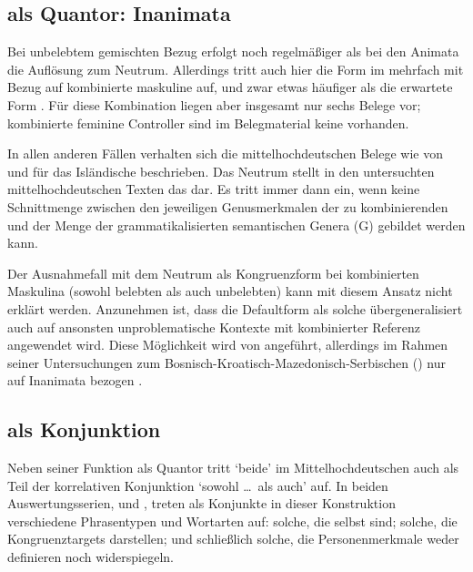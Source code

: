 
\subsection{ als Quantor: Inanimata}

Bei unbelebtem gemischten Bezug erfolgt noch regelmäßiger als bei den
Animata die Auflösung zum Neutrum. Allerdings
tritt auch hier die Form  im \CAO{} mehrfach mit Bezug auf
kombinierte maskuline  auf, und zwar etwas häufiger als die
erwartete Form . Für diese Kombination liegen aber insgesamt nur
sechs Belege vor; kombinierte feminine Controller sind im Belegmaterial keine
vorhanden.

In allen anderen Fällen verhalten sich die
mittelhochdeutschen Belege wie von
\citet{wechslerzlatic2003} und \citet{wechsler2009} für das
Isländische beschrieben. Das Neutrum stellt in den untersuchten
mittelhochdeutschen Texten das  dar. Es
tritt immer dann ein, wenn keine Schnittmenge zwischen den jeweiligen
Genusmerkmalen der zu kombinierenden  und der
Menge der grammatikalisierten semantischen
Genera (G) gebildet werden kann.

Der Ausnahmefall mit dem Neutrum als Kongruenzform bei
kombinierten Maskulina (sowohl belebten als auch unbelebten) kann
mit diesem Ansatz nicht erklärt werden. Anzunehmen ist, dass die
Defaultform als solche übergeneralisiert
auch auf ansonsten unproblematische Kontexte mit kombinierter Referenz
angewendet wird. Diese Möglichkeit wird von \citet[302]{corbett1991} angeführt,
allerdings im Rahmen seiner Untersuchungen zum
Bosnisch-\allowbreak{}Kroatisch-\allowbreak{}Mazedonisch-\allowbreak{}Serbischen
() nur auf Inanimata bezogen
\autocites[vgl.~auch][190]{wechslerzlatic2003}[581]{wechsler2009}.


\subsection{ als Konjunktion}

Neben seiner Funktion als Quantor tritt `beide' im
Mittelhochdeutschen auch als Teil der korrelativen
Konjunktion  `sowohl \dots\ als auch' auf. In beiden
Auswertungs\-serien, \CAO{} und \KC{}, treten als Konjunkte in dieser
Konstruktion verschiedene Phrasen\-typen und Wort\-arten auf: solche, die
selbst  sind; solche, die Kongruenztargets
darstellen; und schließlich solche, die Personenmerkmale weder definieren noch
widerspiegeln.


